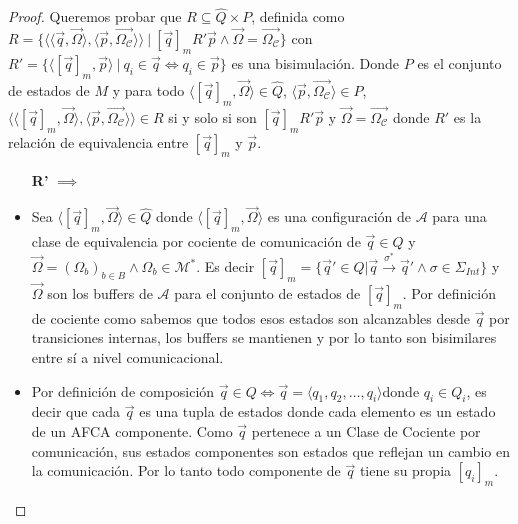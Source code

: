 \begin{proof}

Queremos probar que $R \subseteq \hat{Q} \times P$, definida como $R = \{ \langle \langle \overrightarrow{q}, \overrightarrow{\Omega} \rangle, \langle \overrightarrow{p}, \overrightarrow{\Omega_{\mathcal{C}}} \rangle \rangle \ | \ [\overrightarrow{q}]_mR'\overrightarrow{p} \land  \overrightarrow{\Omega}=\overrightarrow{\Omega_{\mathcal{C}}} \}$ con $R'=\{  \langle [\overrightarrow{q}]_m, \overrightarrow{p} \rangle \ | \ q_i \in \overrightarrow{q} \iff q_i \in \overrightarrow{p} \}$ es una bisimulación. Donde $P$ es el conjunto de estados de $M$ y para todo $\langle [\overrightarrow{q}]_m, \overrightarrow{\Omega} \rangle \in \hat{Q}$, $\langle \overrightarrow{p}, \overrightarrow{\Omega_{\mathcal{C}}} \rangle \in P$, $\langle \langle [\overrightarrow{q}]_m, \overrightarrow{\Omega} \rangle, \langle \overrightarrow{p}, \overrightarrow{\Omega_{\mathcal{C}}} \rangle \rangle \in R$ si y solo si son $[\overrightarrow{q}]_mR'\overrightarrow{p}$ y $\overrightarrow{\Omega}=\overrightarrow{\Omega_{\mathcal{C}}}$ donde $R'$ es la relación de equivalencia entre $[\overrightarrow{q}]_m$ y $\overrightarrow{p}$.

\begin{itemize}
    
    \item[\textbf{R'} $\implies$] 
    \item Sea $\langle [\overrightarrow{q}]_m, \overrightarrow{\Omega} \rangle \in \hat{Q}$ donde $\langle [\overrightarrow{q}]_m, \overrightarrow{\Omega} \rangle$ es una configuración de $\mathcal{A}$ para una clase de equivalencia por cociente de comunicación de $\overrightarrow{q} \in Q$ y $\overrightarrow{\Omega}= (\Omega_b)_{b \in B} \land \Omega_b \in \mathcal{M}^*$. Es decir $[\overrightarrow{q}]_m = \{\overrightarrow{q}' \in Q | \overrightarrow{q} \xrightarrow{\sigma^*} \overrightarrow{q}' \land \sigma  \in  \Sigma_{Int}\}$ y $\overrightarrow{\Omega}$ son los buffers de $\mathcal{A}$ para el conjunto de estados de $[\overrightarrow{q}]_m$. Por definición de cociente como sabemos que todos esos estados son alcanzables desde $\overrightarrow{q}$ por transiciones internas, los buffers se mantienen y por lo tanto son bisimilares entre sí a nivel comunicacional.
    
    \item Por definición de composición $\overrightarrow{q} \in Q \iff \overrightarrow{q} = \langle q_1, q_2,\ldots, q_i \rangle $donde $q_i \in Q_i$, es decir que cada $\overrightarrow{q}$ es una tupla de estados donde cada elemento es un estado de un AFCA componente. Como $\overrightarrow{q}$ pertenece a un Clase de Cociente por comunicación, sus estados componentes son estados que reflejan un cambio en la comunicación. Por lo tanto todo componente de $\overrightarrow{q}$ tiene su propia $[q_i]_m$.
    

\end{itemize}
\end{proof}
